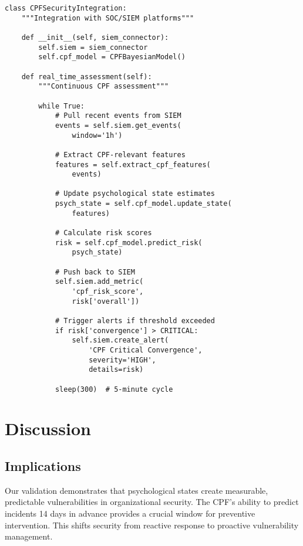 \documentclass[10pt,twocolumn]{IEEEtran}
\begin{document}
\begin{lstlisting}[caption={SOC Integration},label={lst:soc}]
class CPFSecurityIntegration:
    """Integration with SOC/SIEM platforms"""
    
    def __init__(self, siem_connector):
        self.siem = siem_connector
        self.cpf_model = CPFBayesianModel()
        
    def real_time_assessment(self):
        """Continuous CPF assessment"""
        
        while True:
            # Pull recent events from SIEM
            events = self.siem.get_events(
                window='1h')
            
            # Extract CPF-relevant features
            features = self.extract_cpf_features(
                events)
            
            # Update psychological state estimates
            psych_state = self.cpf_model.update_state(
                features)
            
            # Calculate risk scores
            risk = self.cpf_model.predict_risk(
                psych_state)
            
            # Push back to SIEM
            self.siem.add_metric(
                'cpf_risk_score', 
                risk['overall'])
            
            # Trigger alerts if threshold exceeded
            if risk['convergence'] > CRITICAL:
                self.siem.create_alert(
                    'CPF Critical Convergence',
                    severity='HIGH',
                    details=risk)
            
            sleep(300)  # 5-minute cycle
\end{lstlisting}

\section{Discussion}

\subsection{Implications}

Our validation demonstrates that psychological states create measurable, predictable vulnerabilities in organizational security. The CPF's ability to predict incidents 14 days in advance provides a crucial window for preventive intervention. This shifts security from reactive response to proactive vulnerability management.
\end{document}
